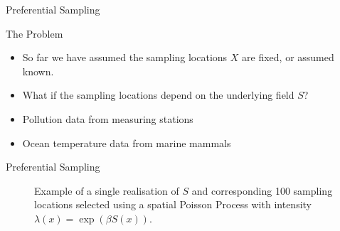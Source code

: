 \documentclass{beamer}
\begin{document}
\begin{frame}{Preferential Sampling}
\begin{block}{The Problem}
\begin{itemize}
\item So far we have assumed the sampling locations $X$ are fixed, or assumed known.
\item What if the sampling locations depend on the underlying field $S$?
\end{itemize}
\end{block}

\begin{example}
\begin{itemize}
\item Pollution data from measuring stations
\item Ocean temperature data from marine mammals
\end{itemize}
\end{example}
\end{frame}

\begin{frame}{Preferential Sampling}

\begin{figure}
\centering
\caption{Example of a single realisation of $S$ and corresponding 100 sampling locations selected using a spatial Poisson Process with intensity $\lambda(x)=\exp(\beta S(x))$.\label{fig:PrefSimPlot}}
\end{figure}

\end{frame}
\end{document}
